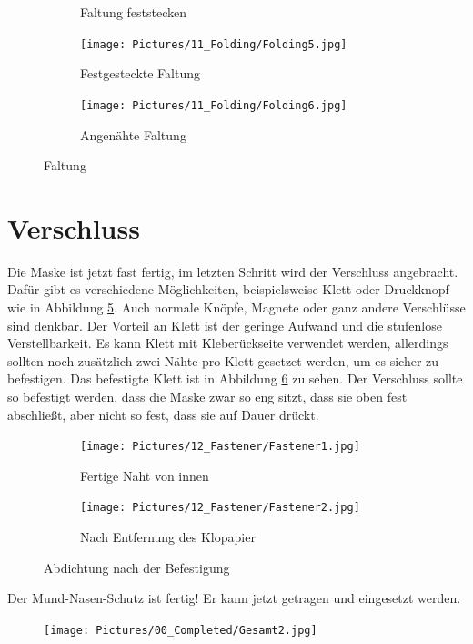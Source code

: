 \documentclass[12pt,parskip=full]{scrartcl}
\begin{document}
\begin{figure}[hp]
\begin{subfigure}{0.48\textwidth}
        \caption{Faltung feststecken}
        \label{Folding4}
    \end{subfigure}
    \begin{subfigure}{0.48\textwidth}
        \centering
        \texttt{[image: Pictures/11\_Folding/Folding5.jpg]}
        \caption{Festgesteckte Faltung}
        \label{Folding5}
    \end{subfigure}
    \begin{subfigure}{0.48\textwidth}
        \centering
        \texttt{[image: Pictures/11\_Folding/Folding6.jpg]}
        \caption{Angenähte Faltung}
        \label{Folding6}
    \end{subfigure}
    \caption{Faltung}
    \label{Folding}
\end{figure}

\clearpage
\section{Verschluss}
Die Maske ist jetzt fast fertig, im letzten Schritt wird der Verschluss angebracht. Dafür gibt es verschiedene Möglichkeiten, beispielsweise Klett oder Druckknopf wie in Abbildung \ref{Fastener1}. Auch normale Knöpfe, Magnete oder ganz andere Verschlüsse sind denkbar. Der Vorteil an Klett ist der geringe Aufwand und die stufenlose Verstellbarkeit. Es kann Klett mit Kleberückseite verwendet werden, allerdings sollten noch zusätzlich zwei Nähte pro Klett gesetzet werden, um es sicher zu befestigen. Das befestigte Klett ist in Abbildung \ref{Fastener2} zu sehen. Der Verschluss sollte so befestigt werden, dass die Maske zwar so eng sitzt, dass sie oben fest abschließt, aber nicht so fest, dass sie auf Dauer drückt.

\begin{figure}[ht]
    \vspace{0.5cm}
    \centering
    \begin{subfigure}{0.48\textwidth}
        \centering
        \texttt{[image: Pictures/12\_Fastener/Fastener1.jpg]}
        \caption{Fertige Naht von innen}
        \label{Fastener1}
    \end{subfigure}
    \begin{subfigure}{0.48\textwidth}
        \centering
        \texttt{[image: Pictures/12\_Fastener/Fastener2.jpg]}
        \caption{Nach Entfernung des Klopapier}
        \label{Fastener2}
    \end{subfigure}
    \caption{Abdichtung nach der Befestigung}
    \label{Fastener}
\end{figure}

\vspace{0.2cm}
Der Mund-Nasen-Schutz ist fertig! Er kann jetzt getragen und eingesetzt werden.

\begin{figure}
    \centering
    \texttt{[image: Pictures/00\_Completed/Gesamt2.jpg]}
    \label{Ready}
\end{figure}

\clearpage

\end{document}
